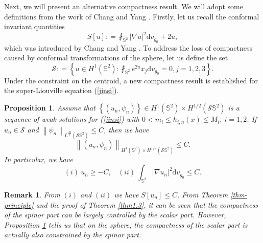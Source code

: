 \documentclass[a4paper, 12pt]{article}
\newtheorem{remark}[theorem]{Remark}
\newtheorem{proposition}[theorem]{Proposition}
\begin{document}
Next, we will present an alternative compactness result. We will adopt some definitions from the work of Chang and Yang \cite{MR1131392, changMR0908146}. Firstly, let us recall the conformal invariant quantities
\[
S\left[ u \right]: = \fint_{{\mathbb{S}^2}} {{{\left| {\nabla u} \right|}^2}{\text{d}{v}_{g_0}} + 2\bar u},
\]
which was introduced by Chang and Yang  \cite{changMR0908146}. To address the loss of compactness caused by conformal transformations of the sphere, let us define the set
\begin{equation}\label{zhixin}
	{\mathscr{S}}: = \left\{ {u \in {H^1}\left( {{\mathbb{S}^2}} \right):\fint_{{\mathbb{S}^2}} {{e^{2u}}{x_j}{\text{d}{v_{g_0}}}}  = 0,j=1,2,3} \right\}.
\end{equation}
Under the constraint on the centroid, a new compactness result is established for the super-Liouville equation (\ref{jinsi}).
\begin{proposition}\label{prop1.4}
	Assume that \(\left\{ {\left( {{u_n},{\psi _n}} \right)} \right\} \in H^1(\mathbb{S}^2)\times H^{1/2}( \mathcal{S}\mathbb{S}^2 )\) is a sequence of weak solutions for (\ref{jinsi}) with $0 < m_i \leq {h_{i,n}}\left( x \right) \leq M_i,\ i=1,2$. If $u_n\in \mathscr{S}$ and ${\left\| \psi_n  \right\|_{{L^{\frac{{32}}{7}}}(\mathcal{S}\mathbb{S}^2)}} \leq C$, then we have
	$$\left\| {\left( {u_n,\psi_n } \right)} \right\|_{H^1(\mathbb{S}^2)\times H^{1/2}( \mathcal{S}\mathbb{S}^2 )} \leq C.$$
	In particular, we have
	$$ (i)~ u_n \geq -C, ~~~~ (ii)~ \int_{\mathbb{S}^2}|\nabla u_n|^2 \mathrm{d}v_{g_0} \leq C.$$
\end{proposition}

\begin{remark}From $(i)$ and $(ii)$ we have $S[u_n]\leq C$. %
	From Theorem \ref{thm-principle} and the proof of Theorem \ref{thm1.3}, it can be seen that the compactness of the spinor part can be largely controlled by the scalar part. However, Proposition \ref{prop1.4} tells us that on the sphere, the compactness of the scalar part is actually also constrained by the spinor part.
\end{remark}
\end{document}
